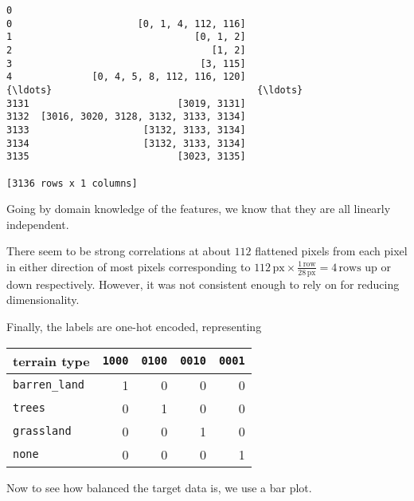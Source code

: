             \begin{tcolorbox}[breakable, size=fbox, boxrule=.5pt, pad at break*=1mm, opacityfill=0]
\begin{Verbatim}[commandchars=\\\{\}]
                                         0
0                      [0, 1, 4, 112, 116]
1                                [0, 1, 2]
2                                   [1, 2]
3                                 [3, 115]
4              [0, 4, 5, 8, 112, 116, 120]
{\ldots}                                    {\ldots}
3131                          [3019, 3131]
3132  [3016, 3020, 3128, 3132, 3133, 3134]
3133                    [3132, 3133, 3134]
3134                    [3132, 3133, 3134]
3135                          [3023, 3135]

[3136 rows x 1 columns]
\end{Verbatim}
\end{tcolorbox}
        
    Going by domain knowledge of the features, we know that they are all
linearly independent.

    There seem to be strong correlations at about \(112\) flattened pixels
from each pixel in either direction of most pixels corresponding to
\(112\,\text{px} \times \frac{1\,\text{row}}{28\,\text{px}} = 4\,\text{rows}\)
up or down respectively. However, it was not consistent enough to rely
on for reducing dimensionality.

    Finally, the labels are one-hot encoded, representing

\begin{longtable}[]{@{}lrrrr@{}}
\toprule
terrain type & \texttt{1000} & \texttt{0100} & \texttt{0010} &
\texttt{0001} \\
\midrule
\endhead
\texttt{barren\_land} & 1 & 0 & 0 & 0 \\
\texttt{trees} & 0 & 1 & 0 & 0 \\
\texttt{grassland} & 0 & 0 & 1 & 0 \\
\texttt{none} & 0 & 0 & 0 & 1 \\
\bottomrule
\end{longtable}

Now to see how balanced the target data is, we use a bar plot.


